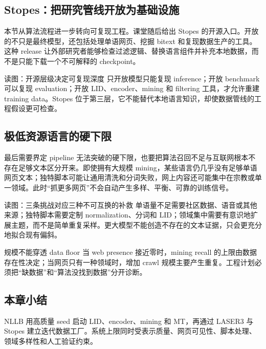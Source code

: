\subsection{Stopes：把研究管线开放为基础设施}

本节从算法流程进一步转向可复现工程。课堂随后给出 Stopes 的开源入口。开放的不只是最终模型，还包括处理单语网页、挖掘 bitext 和复现数据生产的工具。这种 release 让外部研究者能够检查过滤逻辑、替换语言组件并补充本地数据，而不是只能下载一个不可解释的 checkpoint。


\begin{knowledgebox}{读图：开源层级决定可复现深度}
只开放模型只能复现 inference；开放 benchmark 可以复现 evaluation；开放 LID、encoder、mining 和 filtering 工具，才允许重建 training data。Stopes 位于第三层，它不能替代本地语言知识，却使数据管线的工程假设更可检查。
\end{knowledgebox}

\subsection{极低资源语言的硬下限}

最后需要界定 pipeline 无法突破的硬下限，也要把算法召回不足与互联网根本不存在足够文本区分开来。即使拥有大规模 mining，某些语言仍几乎没有足够单语网页文本；独特脚本可能让通用清洗和分词失败，网上内容还可能集中在宗教或单一领域。此时“抓更多网页”不会自动产生多样、平衡、可靠的训练信号。


\begin{knowledgebox}{读图：三条挑战对应三种不可互换的补救}
单语量不足需要社区数据、语音或其他来源；独特脚本需要定制 normalization、分词和 LID；领域集中需要有意识地扩展主题，而不是简单重复采样。更大模型不能创造不存在的文本证据，只会更充分地拟合现有偏斜。
\end{knowledgebox}

\begin{warningbox}{规模不能穿透 data floor}
当 web presence 接近零时，mining recall 的上限由数据存在性决定；当网页只有一种领域时，增加 crawl 规模主要产生重复。工程计划必须把“缺数据”和“算法没找到数据”分开诊断。
\end{warningbox}


\subsection{本章小结}

NLLB 用高质量 seed 启动 LID、encoder、mining 和 MT，再通过 LASER3 与 Stopes 建立迭代数据工厂。系统上限同时受表示质量、网页可见性、脚本处理、领域多样性和人工验证约束。

